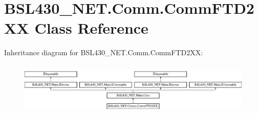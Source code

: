 \hypertarget{class_b_s_l430___n_e_t_1_1_comm_1_1_comm_f_t_d2_x_x}{}\section{B\+S\+L430\+\_\+\+N\+E\+T.\+Comm.\+Comm\+F\+T\+D2\+XX Class Reference}
\label{class_b_s_l430___n_e_t_1_1_comm_1_1_comm_f_t_d2_x_x}
Inheritance diagram for B\+S\+L430\+\_\+\+N\+E\+T.\+Comm.\+Comm\+F\+T\+D2\+XX\+:\begin{figure}[H]
\begin{center}
\leavevmode
\includegraphics[height=2.545455cm]{class_b_s_l430___n_e_t_1_1_comm_1_1_comm_f_t_d2_x_x}
\end{center}
\end{figure}
